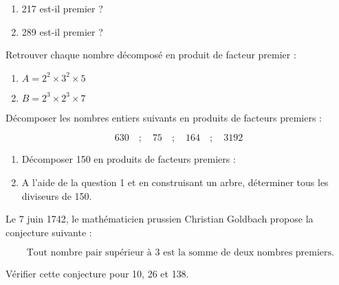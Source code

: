 \begin{Mt}

\end{Mt}

\begin{Th}

\end{Th}



\begin{enumerate}
\item 217 est-il premier ?
\item 289 est-il premier ?
\end{enumerate}


Retrouver chaque nombre décomposé en produit de facteur premier : 
\begin{enumerate}
\item $A = 2^2 \times 3^2 \times 5$
\item $B = 2^3 \times 2^3 \times 7$
\end{enumerate}



Décomposer les nombres entiers suivants en produits de facteurs premiers : 
 
$$ 630 \quad ; \quad  75 \quad ; \quad 164 \quad ; \quad 3192 $$



\begin{enumerate}
\item Décomposer 150 en produits de facteurs premiers : 
\item A l'aide de la question 1 et en construisant un  arbre, déterminer tous les diviseurs de 150.
\end{enumerate} 
 


Le 7 juin 1742, le mathématicien prussien Christian Goldbach   propose la conjecture suivante :

  $$ \text{ Tout nombre pair supérieur à 3 est la somme de deux nombres premiers.}$$

Vérifier cette conjecture pour 10, 26 et 138.






